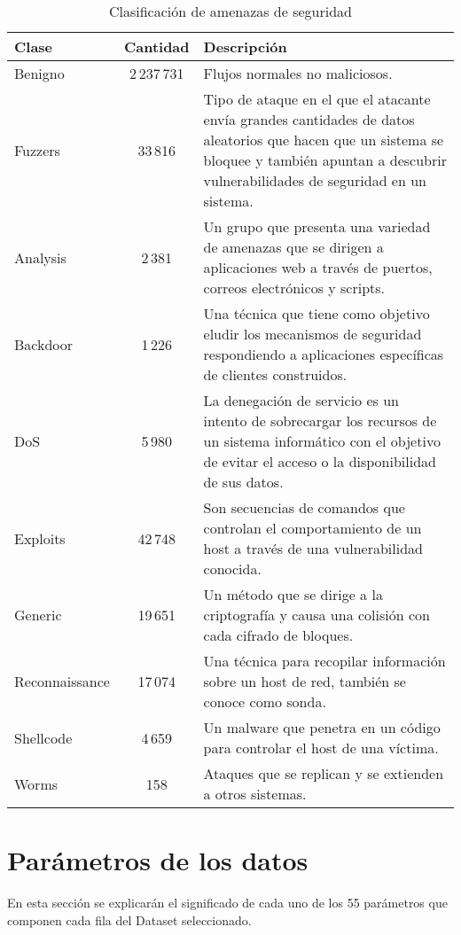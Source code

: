 \begin{table}[H]
\label{tab:attacks-tab}
\begin{tabular}{|l|c|>{\RaggedRight}p{10cm}|} %
\hline
\rowcolor[HTML]{C0C0C0} 
\textbf{Clase} & \textbf{Cantidad} & \textbf{Descripción} \\ \hline
Benigno & 2\,237\,731 & Flujos normales no maliciosos. \\ \hline
Fuzzers & 33\,816 & Tipo de ataque en el que el atacante envía grandes cantidades de datos aleatorios que hacen que un sistema se bloquee y también apuntan a descubrir vulnerabilidades de seguridad en un sistema. \\ \hline
Analysis & 2\,381 & Un grupo que presenta una variedad de amenazas que se dirigen a aplicaciones web a través de puertos, correos electrónicos y scripts. \\ \hline
Backdoor & 1\,226 & Una técnica que tiene como objetivo eludir los mecanismos de seguridad respondiendo a aplicaciones específicas de clientes construidos. \\ \hline
DoS & 5\,980 & La denegación de servicio es un intento de sobrecargar los recursos de un sistema informático con el objetivo de evitar el acceso o la disponibilidad de sus datos. \\ \hline
Exploits & 42\,748 & Son secuencias de comandos que controlan el comportamiento de un host a través de una vulnerabilidad conocida. \\ \hline
Generic & 19\,651 & Un método que se dirige a la criptografía y causa una colisión con cada cifrado de bloques. \\ \hline
Reconnaissance & 17\,074 & Una técnica para recopilar información sobre un host de red, también se conoce como sonda. \\ \hline
Shellcode & 4\,659 & Un malware que penetra en un código para controlar el host de una víctima. \\ \hline
Worms & 158 & Ataques que se replican y se extienden a otros sistemas. \\ \hline
\end{tabular}
\centering
\caption{Clasificación de amenazas de seguridad}
\end{table}

\section{Parámetros de los datos} \label{sec.param-datos}
En esta sección se explicarán el significado de cada uno de los 55 parámetros que componen cada fila del Dataset seleccionado.


